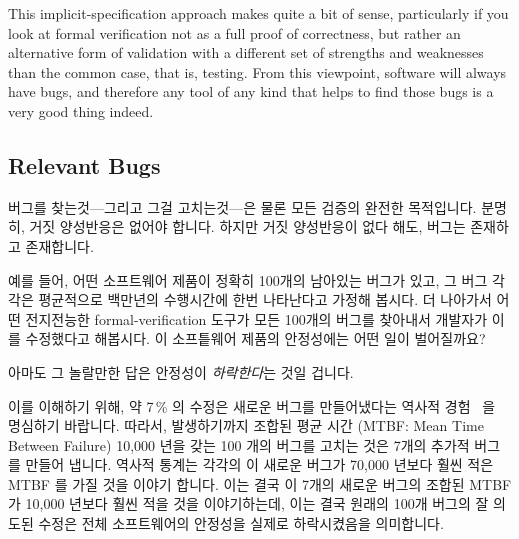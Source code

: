 This implicit-specification approach makes quite a bit of sense, particularly
if you look at formal verification not as a full proof of correctness,
but rather an alternative form of validation with a different set of
strengths and weaknesses than the common case, that is, testing.
From this viewpoint, software will always have bugs, and therefore any
tool of any kind that helps to find those bugs is a very good thing
indeed.
\fi

\subsection{Relevant Bugs}
\label{sec:future:Relevant Bugs}

버그를 찾는것---그리고 그걸 고치는것---은 물론 모든 검증의 완전한 목적입니다.
분명히, 거짓 양성반응은 없어야 합니다.
하지만 거짓 양성반응이 없다 해도, 버그는 존재하고 존재합니다.

예를 들어, 어떤 소프트웨어 제품이 정확히 100개의 남아있는 버그가 있고, 그 버그
각각은 평균적으로 백만년의 수행시간에 한번 나타난다고 가정해 봅시다.
더 나아가서 어떤 전지전능한 formal-verification 도구가 모든 100개의 버그를
찾아내서 개발자가 이를 수정했다고 해봅시다.
이 소프틑웨어 제품의 안정성에는 어떤 일이 벌어질까요?

아마도 그 놀랄만한 답은 안정성이 \emph{하락한다}는 것일 겁니다.
\iffalse

Finding bugs---and fixing them---is of course the whole point of any
type of validation effort.
Clearly, false positives are to be avoided.
But even in the absense of false positives, there are bugs and there are bugs.

For example, suppose that a software artifact had exactly 100 remaining
bugs, each of which manifested on average once every million years
of runtime.
Suppose further that an omniscient formal-verification tool located
all 100 bugs, which the developers duly fixed.
What happens to the reliability of this software artifact?

The perhaps surprising answer is that the reliability \emph{decreases}.
\fi

이를 이해하기 위해, 약 7\,\% 의 수정은 새로운 버그를 만들어냈다는 역사적
경험~\cite{RexBlack2012SQA} 을 명심하기 바랍니다.
따라서, 발생하기까지 조합된 평균 시간 (MTBF: Mean Time Between Failure) 10,000
년을 갖는 100 개의 버그를 고치는 것은 7개의 추가적 버그를 만들어 냅니다.
역사적 통계는 각각의 이 새로운 버그가 70,000 년보다 훨씬 적은 MTBF 를 가질 것을
이야기 합니다.
이는 결국 이 7개의 새로운 버그의 조합된 MTBF 가 10,000 년보다 훨씬 적을 것을
이야기하는데, 이는 결국 원래의 100개 버그의 잘 의도된 수정은 전체 소프트웨어의
안정성을 실제로 하락시켰음을 의미합니다.
\iffalse

